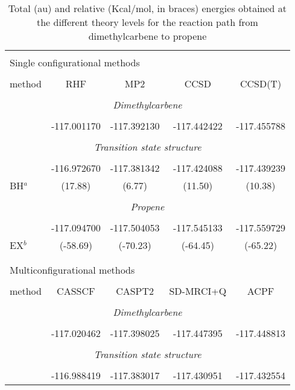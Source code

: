 \begin{table}[p]
\caption{\label{tab:rpener}Total (au) and relative (Kcal/mol, in braces) energies obtained at the different
theory levels for the reaction path from dimethylcarbene to propene}
\begin{center}
\begin{tabular}{lcccc} 
\\ \hline \hline
\\
\multicolumn{5}{l}{Single configurational methods}\\
\\
method  &     RHF     &     MP2     &    CCSD     &    CCSD(T) \\\hline
\\
\multicolumn{5}{c}{\it Dimethylcarbene} \\
\\
        & -117.001170 & -117.392130 & -117.442422 & -117.455788  \\
\\
\multicolumn{5}{c}{\it Transition state structure} \\
\\
        & -116.972670 & -117.381342 & -117.424088 & -117.439239  \\
BH$^a$  & (17.88)     & (6.77)      & (11.50)     & (10.38)      \\
\\
\multicolumn{5}{c}{\it Propene} \\
\\
        & -117.094700 & -117.504053 & -117.545133 & -117.559729  \\
EX$^b$  & (-58.69)    & (-70.23)    & (-64.45)    & (-65.22)     \\  
\\\hline\hline
\\
\multicolumn{5}{l}{Multiconfigurational methods}\\
\\
method  &  CASSCF     &   CASPT2    &  SD-MRCI+Q  &    ACPF   \\\hline
\\
\multicolumn{5}{c}{\it Dimethylcarbene} \\
\\
        & -117.020462 & -117.398025 & -117.447395 & -117.448813  \\
\\
\multicolumn{5}{c}{\it Transition state structure} \\
\\
        & -116.988419 & -117.383017 & -117.430951 & -117.432554  \\

\end{tabular}
\end{center}
\end{table}
